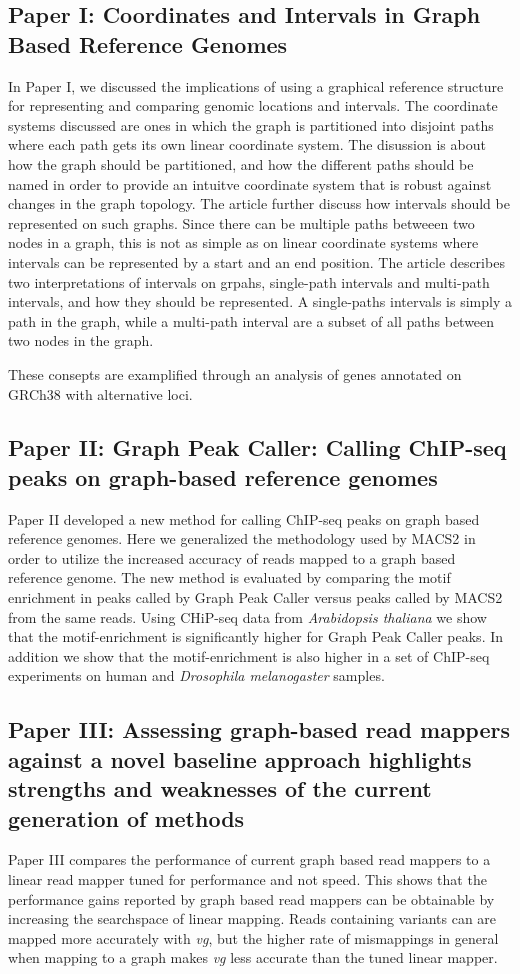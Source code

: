 \subsection*{Paper I: Coordinates and Intervals in Graph Based Reference Genomes}
In Paper I, we discussed the implications of using a graphical reference structure for representing and comparing genomic locations and intervals.
The coordinate systems discussed are ones in which the graph is partitioned into disjoint paths where each path gets its own linear coordinate system.
The disussion is about how the graph should be partitioned, and how the different paths should be named in order to provide an intuitve coordinate system that is robust against changes in the graph topology. 
The article further discuss how intervals should be represented on such graphs.
Since there can be multiple paths betweeen two nodes in a graph, this is not as simple as on linear coordinate systems where intervals can be represented by a start and an end position.
The article describes two interpretations of intervals on grpahs, single-path intervals and multi-path intervals, and how they should be represented.
A single-paths intervals is simply a path in the graph, while a multi-path interval are a subset of all paths between two nodes in the graph. 

These consepts are examplified through an analysis of genes annotated on GRCh38 with alternative loci.


\subsection*{Paper II: Graph Peak Caller: Calling ChIP-seq peaks on graph-based reference genomes}
Paper II developed a new method for calling ChIP-seq peaks on graph based reference genomes.
Here we generalized the methodology used by MACS2 in order to utilize the increased accuracy of reads mapped to a graph based reference genome.
The new method is evaluated by comparing the motif enrichment in peaks called by Graph Peak Caller versus peaks called by MACS2 from the same reads.
Using CHiP-seq data from \emph{Arabidopsis thaliana} we show that the motif-enrichment is significantly higher for Graph Peak Caller peaks.
In addition we show that the motif-enrichment is also higher in a set of ChIP-seq experiments on human and \emph{Drosophila melanogaster} samples.

\subsection*{Paper III: Assessing graph-based read mappers against a novel baseline approach highlights strengths and weaknesses of the current generation of methods}
Paper III compares the performance of current graph based read mappers to a linear read mapper tuned for performance and not speed.
This shows that the performance gains reported by graph based read mappers can be obtainable by increasing the searchspace of linear mapping.
Reads containing variants can are mapped more accurately with \emph{vg}, but the higher rate of mismappings in general when mapping to a graph makes \emph{vg} less accurate than the tuned linear mapper.

